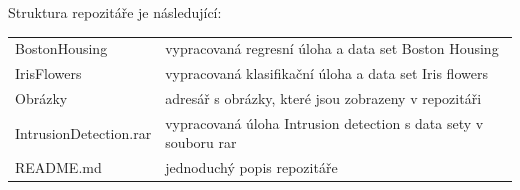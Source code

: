 \documentclass[male,czech,api_ing]{thesis}
\begin{document}
Struktura repozitáře je následující:
\begin{longtable}{ll}
\hline
BostonHousing & vypracovaná regresní úloha a data set Boston Housing \\
IrisFlowers & vypracovaná klasifikační úloha a data set Iris flowers \\
Obrázky & adresář s obrázky, které jsou zobrazeny v repozitáři \\
IntrusionDetection.rar & vypracovaná úloha Intrusion detection s data sety v souboru rar\\
README.md & jednoduchý popis repozitáře\\
\hline
\end{longtable}

\end{document}
